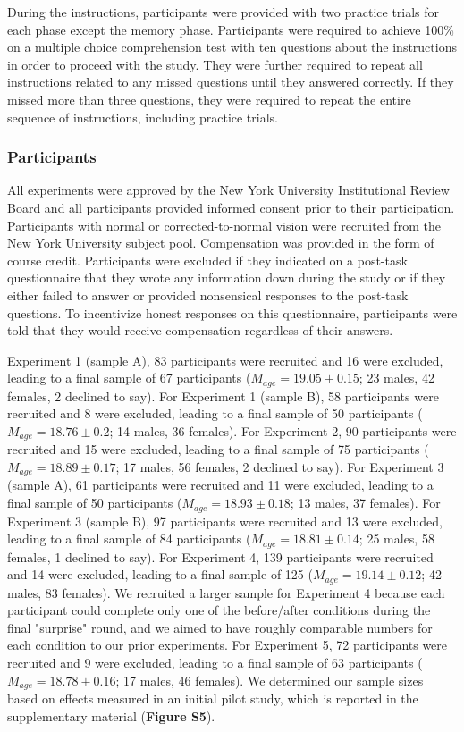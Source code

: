 \documentclass[10pt,letterpaper]{article}
\begin{document}
During the instructions, participants were provided with two practice trials for each phase except the memory phase. Participants were required to achieve 100\% on a multiple choice comprehension test with ten questions about the instructions in order to proceed with the study. They were further required to repeat all instructions related to any missed questions until they answered correctly. If they missed more than three questions, they were required to repeat the entire sequence of instructions, including practice trials.

\subsubsection{Participants}

All experiments were approved by the New York University Institutional Review Board and all participants provided informed consent prior to their participation. Participants with normal or corrected-to-normal vision were recruited from the New York University subject pool. Compensation was provided in the form of course credit. Participants were excluded if they indicated on a post-task questionnaire that they wrote any information down during the study or if they either failed to answer or provided nonsensical responses to the post-task questions. To incentivize honest responses on this questionnaire, participants were told that they would receive compensation regardless of their answers.

Experiment 1 (sample A), 83 participants were recruited and 16 were excluded, leading to a final sample of 67 participants ($M_{age} = 19.05 \pm 0.15$; 23 males, 42 females, 2 declined to say). For Experiment 1 (sample B), 58 participants were recruited and 8 were excluded, leading to a final sample of 50 participants ($M_{age} = 18.76 \pm 0.2$; 14 males, 36 females). For Experiment 2, 90 participants were recruited and 15 were excluded, leading to a final sample of 75 participants ($M_{age} = 18.89 \pm 0.17$; 17 males, 56 females, 2 declined to say). For Experiment 3 (sample A), 61 participants were recruited and 11 were excluded, leading to a final sample of 50 participants ($M_{age} = 18.93 \pm 0.18$; 13 males, 37 females). For Experiment 3 (sample B), 97 participants were recruited and 13 were excluded, leading to a final sample of 84 participants ($M_{age} = 18.81 \pm 0.14$; 25 males, 58 females, 1 declined to say). For Experiment 4, 139 participants were recruited and 14 were excluded, leading to a final sample of 125 ($M_{age} = 19.14 \pm 0.12$; 42 males, 83 females). We recruited a larger sample for Experiment 4 because each participant could complete only one of the before/after conditions during the final "surprise" round, and we aimed to have roughly comparable numbers for each condition to our prior experiments. For Experiment 5, 72 participants were recruited and 9 were excluded, leading to a final sample of 63 participants ($M_{age} = 18.78 \pm 0.16$; 17 males, 46 females). We determined our sample sizes based on effects measured in an initial pilot study, which is reported in the supplementary material (\textbf{Figure S5}).
\end{document}
